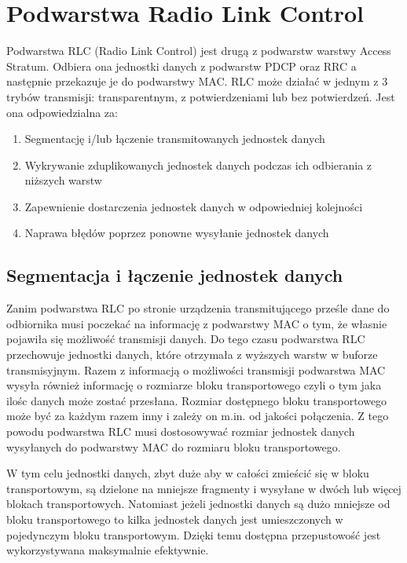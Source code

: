 \chapter{Podwarstwa Radio Link Control}
\label{cha:rlc}

Podwarstwa RLC (Radio Link Control) jest drugą z podwarstw warstwy Access Stratum. Odbiera ona jednostki danych z podwarstw PDCP oraz RRC a następnie przekazuje je do podwarstwy MAC. RLC może działać w jednym z 3 trybów transmisji: transparentnym, z potwierdzeniami lub bez potwierdzeń. Jest ona odpowiedzialna za:

\begin{enumerate}
	\item Segmentację i/lub łączenie transmitowanych jednostek danych
	\item Wykrywanie zduplikowanych jednostek danych podczas ich odbierania z niższych warstw
	\item Zapewnienie dostarczenia jednostek danych w odpowiedniej kolejności
	\item Naprawa błędów poprzez ponowne wysyłanie jednostek danych
\end{enumerate}

\section{Segmentacja i łączenie jednostek danych}

Zanim podwarstwa RLC po stronie urządzenia transmitującego prześle dane do odbiornika musi poczekać na informację z podwarstwy MAC o tym, że własnie pojawiła się możliwość transmisji danych. Do tego czasu podwarstwa RLC przechowuje jednostki danych, które otrzymała z wyższych warstw w buforze transmisyjnym. Razem z informacją o możliwości transmisji podwarstwa MAC wysyła również informację o rozmiarze bloku transportowego czyli o tym jaka ilośc danych może zostać przesłana. Rozmiar dostępnego bloku transportowego może być za każdym razem inny i zależy on m.in. od jakości połączenia. Z tego powodu podwarstwa RLC musi dostosowywać rozmiar jednostek danych wysyłanych do podwarstwy MAC do rozmiaru bloku transportowego.

W tym celu jednostki danych, zbyt duże aby w całości zmieścić się w bloku transportowym, są dzielone na mniejsze fragmenty i wysyłane w dwóch lub więcej blokach transportowych. Natomiast jeżeli jednostki danych są dużo mniejsze od bloku transportowego to kilka jednostek danych jest umieszczonych w pojedynczym bloku transportowym. Dzięki temu dostępna przepustowość jest wykorzystywana maksymalnie efektywnie.

